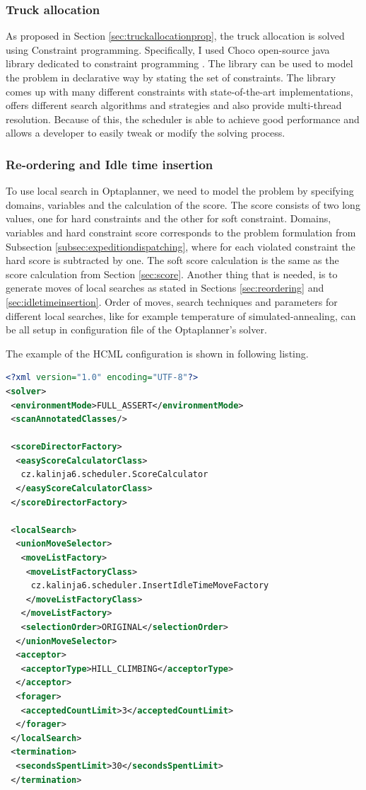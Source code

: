 \documentclass{ctuthesis}
\begin{document}
\subsubsection{Truck allocation}

As proposed in Section \ref{sec:truckallocationprop}, the truck allocation is solved using Constraint programming. Specifically, I used Choco open-source java library dedicated to constraint programming \cite{choco}. The library can be used to model the problem in declarative way by stating the set of constraints. The library comes up with many different constraints with state-of-the-art implementations, offers different search algorithms and strategies and also provide multi-thread resolution. Because of this, the scheduler is able to achieve good performance and allows a developer to easily tweak or modify the solving process. 

\subsubsection{Re-ordering and Idle time insertion}

To use local search in Optaplanner, we need to model the problem by specifying domains, variables and the calculation of the score. The score consists of two long values, one for hard constraints and the other for soft constraint. Domains, variables and hard constraint score corresponds to the problem formulation from Subsection \ref{subsec:expeditiondispatching}, where for each violated constraint the hard score is subtracted by one. The soft score calculation is the same as the score calculation from Section \ref{sec:score}.
Another thing that is needed, is to generate moves of local searches as stated in Sections \ref{sec:reordering} and \ref{sec:idletimeinsertion}. Order of moves, search techniques and parameters for different local searches, like for example temperature of simulated-annealing, can be all setup in configuration file of the Optaplanner's solver.

The example of the HCML configuration is shown in following listing.


\begin{lstlisting}[language=XML, caption=Optaplanner local search configuration]
<?xml version="1.0" encoding="UTF-8"?>
<solver>
 <environmentMode>FULL_ASSERT</environmentMode>
 <scanAnnotatedClasses/>

 <scoreDirectorFactory>
  <easyScoreCalculatorClass>
   cz.kalinja6.scheduler.ScoreCalculator
  </easyScoreCalculatorClass>
 </scoreDirectorFactory>

 <localSearch>
  <unionMoveSelector>
   <moveListFactory>
    <moveListFactoryClass>
     cz.kalinja6.scheduler.InsertIdleTimeMoveFactory
    </moveListFactoryClass>
   </moveListFactory>
   <selectionOrder>ORIGINAL</selectionOrder>
  </unionMoveSelector>
  <acceptor>
   <acceptorType>HILL_CLIMBING</acceptorType>
  </acceptor>
  <forager>
   <acceptedCountLimit>3</acceptedCountLimit>
  </forager>
 </localSearch>
 <termination>
  <secondsSpentLimit>30</secondsSpentLimit>
 </termination>
\end{lstlisting}
\end{document}
